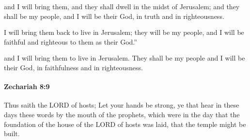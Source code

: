 			\begin{versebox}
					\item[BHS] 
					\item[LXX] 
					\item[ASV] and I will bring them, and they shall dwell in the midst of Jerusalem; and they shall be my people, and I will be their God, in truth and in righteousness.
					\item[NIV] I will bring them back to live in Jerusalem; they will be my people, and I will be faithful and righteous to them as their God.”
					\item[NRSV] and I will bring them to live in Jerusalem. They shall be my people and I will be their God, in faithfulness and in righteousness.
			\end{versebox}

		\paragraph{Zechariah 8:9} %
			\label{ZECHARIAH-8-9}

			Thus saith the LORD of hosts; Let your hands be strong, ye that hear in these days these words by the mouth of the prophets, which were in the day that the foundation of the house of the LORD of hosts was laid, that the temple might be built.

